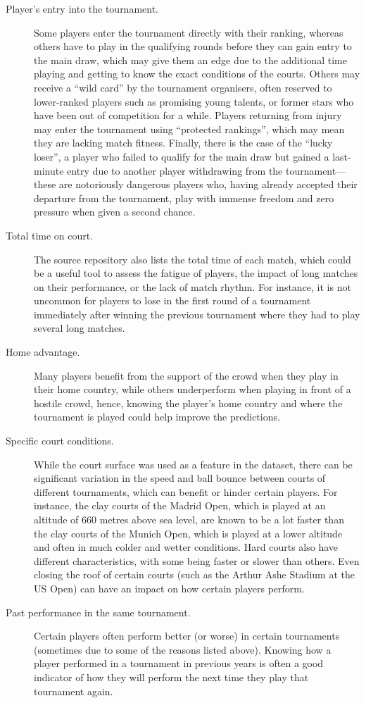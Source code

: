 \begin{description}
  \item[Player's entry into the tournament.] Some players enter the tournament directly with their
  ranking, whereas others have to play in the qualifying rounds before they can gain entry to the
  main draw, which may give them an edge due to the additional time playing and getting to know the
  exact conditions of the courts. Others may receive a ``wild card'' by the tournament organisers,
  often reserved to lower-ranked players such as promising young talents, or former stars who have
  been out of competition for a while. Players returning from injury may enter the tournament using
  ``protected rankings'', which may mean they are lacking match fitness. Finally, there is the case
  of the ``lucky loser'', a player who failed to qualify for the main draw but gained a last-minute
  entry due to another player withdrawing from the tournament---these are notoriously dangerous
  players who, having already accepted their departure from the tournament, play with immense
  freedom and zero pressure when given a second chance.

  \item[Total time on court.] The source repository also lists the total time of each match, which
  could be a useful tool to assess the fatigue of players, the impact of long matches on their
  performance, or the lack of match rhythm. For instance, it is not uncommon for players to lose in
  the first round of a tournament immediately after winning the previous tournament where they had
  to play several long matches.

  \item[Home advantage.] Many players benefit from the support of the crowd when they play in their
  home country, while others underperform when playing in front of a hostile crowd, hence, knowing
  the player's home country and where the tournament is played could help improve the predictions.

  \item[Specific court conditions.] While the court surface was used as a feature in the dataset,
  there can be significant variation in the speed and ball bounce between courts of different
  tournaments, which can benefit or hinder certain players. For instance, the clay courts of the
  Madrid Open, which is played at an altitude of 660 metres above sea level, are
  known to be a lot faster than the clay courts of the Munich Open, which is played at a lower
  altitude and often in much colder and wetter conditions. Hard courts also have different
  characteristics, with some being faster or slower than others. Even closing the roof of certain
  courts (such as the Arthur Ashe Stadium at the US Open) can have an impact on how certain
  players perform.

  \item[Past performance in the same tournament.] Certain players often perform better (or worse) in
  certain tournaments (sometimes due to some of the reasons listed above). Knowing how a player
  performed in a tournament in previous years is often a good indicator of how they will
  perform the next time they play that tournament again.
\end{description}

